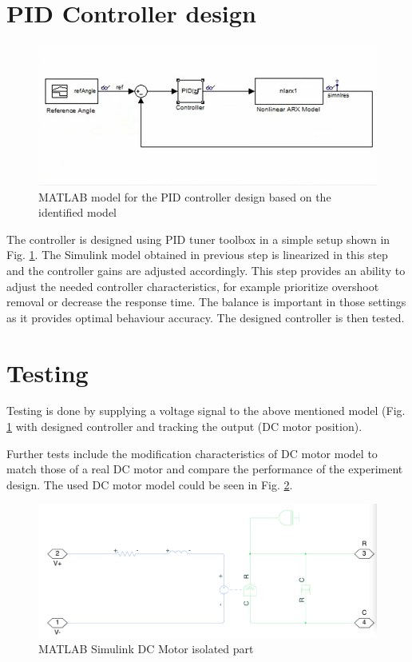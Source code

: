 \documentclass[]{final_report}
\begin{document}
\section{PID Controller design}

\begin{figure} [h!]
\centerline{\includegraphics[width=.85\textwidth]{Screenshots for paper/matlab models/PIDdesign.png}}
\caption{MATLAB model for the PID controller design based on the identified model}
\label{fig:PIDdes}
\end{figure}

The controller is designed using PID tuner toolbox in a simple setup shown in Fig. \ref{fig:PIDdes}. The Simulink model obtained in previous step is linearized in this step and the controller gains are adjusted accordingly. This step provides an ability to adjust the needed controller characteristics, for example prioritize overshoot removal or decrease the response time. The balance is important in those settings as it provides optimal behaviour accuracy. The designed controller is then tested.

\section{Testing}

Testing is done by supplying a voltage signal to the above mentioned model (Fig. \ref{fig:PIDdes} with designed controller and tracking the output (DC motor position). 

Further tests include the modification characteristics of DC motor model to match those of a real DC motor and compare the performance of the experiment design. The used DC motor model could be seen in Fig. \ref{fig:MatlabMotorDCpart}. 

\begin{figure} [h!]
\centerline{\includegraphics[width=.95\textwidth]{Screenshots for paper/matlab models/DC Motor.png}}
\caption{MATLAB Simulink DC Motor isolated part}
\label{fig:MatlabMotorDCpart}
\end{figure}
\end{document}
